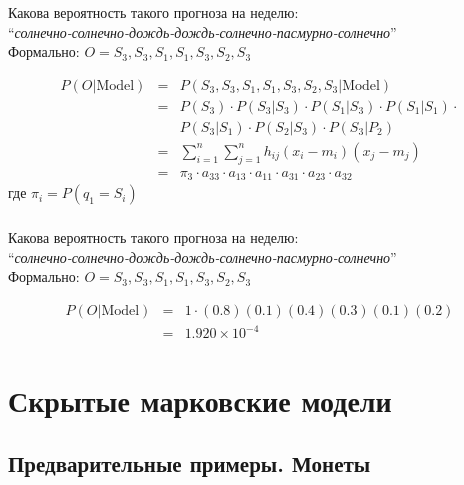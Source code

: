 \documentclass{beamer}
\begin{document}
\begin{frame} \label{example_begin}
  \frametitle{\insertsection}
  \framesubtitle{\insertsubsection}
  Какова вероятность такого прогноза на неделю: \\
  ``\textit{\small{солнечно-солнечно-дождь-дождь-солнечно-пасмурно-солнечно}}''\\
  Формально: $O = S_3, S_3, S_1, S_1, S_3, S_2, S_3$ \pause

  \begin{eqnarray*}
    P(O | \text{Model}) & = & P(S_3, S_3, S_1, S_1, S_3, S_2, S_3 | \text{Model})\\
    & = & P(S_3) \cdot P(S_3|S_3) \cdot P(S_1|S_3) \cdot P(S_1|S_1) \cdot \\
    && P(S_3|S_1) \cdot P(S_2|S_3) \cdot P(S_3|P_2) \\
    & = & \sum_{i = 1}^{n}\sum_{j = 1}^{n} h_{ij}(x_i - m_i)(x_j - m_j) \\
    & = & \pi_3 \cdot a_{33} \cdot a_{13} \cdot a_{11} \cdot a_{31}\cdot a_{23} \cdot a_{32}
  \end{eqnarray*}
  где $\pi_i = P(q_1 = S_i)$
\end{frame}

\begin{frame} \label{example_begin}
  \frametitle{\insertsection}
  \framesubtitle{\insertsubsection}
  Какова вероятность такого прогноза на неделю: \\
  ``\textit{\small{солнечно-солнечно-дождь-дождь-солнечно-пасмурно-солнечно}}''\\
  Формально: $O = S_3, S_3, S_1, S_1, S_3, S_2, S_3$

  \begin{eqnarray*}
    P(O | \text{Model}) & = & 1 \cdot (0.8)(0.1)(0.4)(0.3)(0.1)(0.2) \\
    & = & 1.920 \times 10^{-4}
  \end{eqnarray*}
\end{frame}


\section{Скрытые марковские модели}

\subsection{Предварительные примеры. Монеты}
\end{document}
